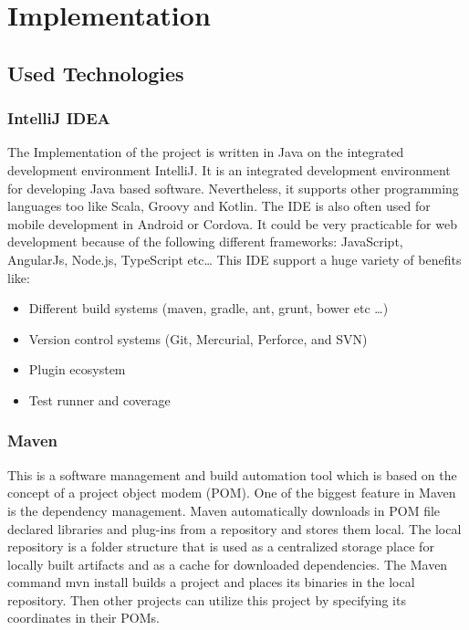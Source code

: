 \chapter{Implementation}
\section{Used Technologies}
\subsection{IntelliJ IDEA} 
The Implementation of the project is written in Java on the integrated development environment IntelliJ. It is an integrated development environment for developing Java based software. Nevertheless, it supports other programming languages too like Scala, Groovy and Kotlin. The IDE is also often used for mobile development in Android or Cordova. It could be very practicable for web development because of the following different frameworks: JavaScript, AngularJs, Node.js, TypeScript etc…
This IDE support a huge variety of benefits like:
\begin{itemize}
\item Different build systems (maven, gradle, ant, grunt, bower etc \ldots)
\item Version control systems (Git, Mercurial, Perforce, and SVN)
\item Plugin ecosystem
\item Test runner and coverage
\end{itemize}
\subsection{Maven} \label{ssec:maven}
This is a software management and build automation tool which is based on the concept of a project object modem (POM). One of the biggest feature in Maven is the dependency management. Maven automatically downloads in POM file declared libraries and plug-ins from a repository and stores them local. The local repository is a folder structure that is used as a centralized storage place for locally built artifacts and as a cache for downloaded dependencies. The Maven command mvn install builds a project and places its binaries in the local repository. Then other projects can utilize this project by specifying its coordinates in their POMs.

